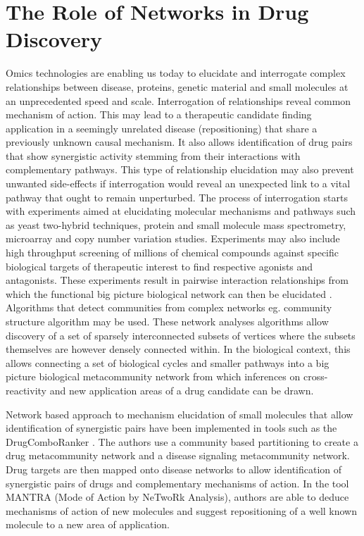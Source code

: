 \documentclass[]{book}
\begin{document}
\section{The Role of Networks in Drug Discovery}  
\label{sec:role-networks-drug}
Omics technologies are enabling us today to elucidate and interrogate
complex relationships between disease, proteins, genetic material and
small molecules at an unprecedented speed and scale. Interrogation of
relationships reveal common mechanism of action. This may lead to a
therapeutic candidate finding application in a seemingly unrelated
disease (repositioning) that share a previously unknown causal
mechanism. It also allows identification of drug pairs that show
synergistic activity stemming from their interactions with
complementary pathways. This type of relationship elucidation may also
prevent unwanted side-effects if interrogation would reveal an
unexpected link to a vital pathway that ought to remain
unperturbed. The process of interrogation starts with experiments
aimed at elucidating molecular mechanisms and pathways such as yeast
two-hybrid techniques, protein and small molecule mass spectrometry,
microarray and copy number variation studies. Experiments may also
include high throughput screening of millions of chemical compounds
against specific biological targets of therapeutic interest to find
respective agonists and antagonists. These experiments result in
pairwise interaction relationships from which the functional big
picture biological network can then be elucidated
\cite{Wu2010}. Algorithms that detect communities from complex
networks eg. community structure algorithm \cite{girvan2002community}
may be used. These network analyses algorithms allow discovery of a
set of sparsely interconnected subsets of vertices where the subsets
themselves are however densely connected within. In the biological
context, this allows connecting a set of biological cycles and smaller
pathways into a big picture biological metacommunity network from
which inferences on cross-reactivity and new application areas of a
drug candidate can be drawn.

Network based approach to mechanism elucidation of small molecules
that allow identification of synergistic pairs have been implemented
in tools such as the DrugComboRanker
\cite{huang2014drugcomboranker}. The authors use a community based
partitioning to create a drug metacommunity network and a disease
signaling metacommunity network. Drug targets are then mapped onto
disease networks to allow identification of synergistic pairs of drugs
and complementary mechanisms of action.  In the tool MANTRA (Mode of
Action by NeTwoRk Analysis)\cite{iorio2010discovery}, authors are able
to deduce mechanisms of action of new molecules and suggest
repositioning of a well known molecule to a new area of application.
\end{document}
